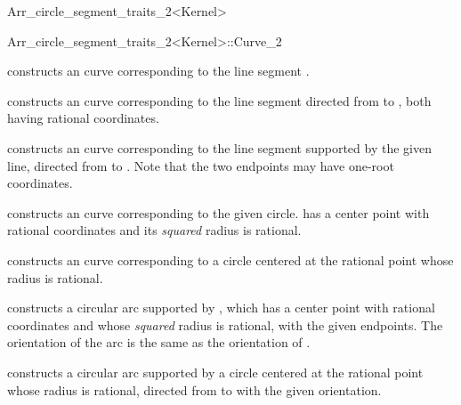 \begin{ccRefClass}{Arr_circle_segment_traits_2<Kernel>}
\begin{ccClass}{Arr_circle_segment_traits_2<Kernel>::Curve_2}

\ccCreation
{}

    {constructs an curve corresponding to the line segment .}

    {constructs an curve corresponding to the line segment directed
     from  to , both having rational coordinates.}

    {constructs an curve corresponding to the line segment supported by
     the given line, directed from  to .
     Note that the two endpoints may have one-root coordinates.
     }

    {constructs an curve corresponding to the given circle. 
     has a center point with rational coordinates and its {\em squared}
     radius is rational.}

    {constructs an curve corresponding to a circle centered at the rational
     point  whose radius  is rational.}

    {constructs a circular arc supported by , which has a
     center point with rational coordinates and whose {\em squared}
     radius is rational, with the given endpoints. The orientation of the
     arc is the same as the orientation of .
     }

    {constructs a circular arc supported by a circle centered at the rational
     point  whose radius  is rational, directed from
      to  with the given orientation.
     }


\end{ccClass}
\end{ccRefClass}
